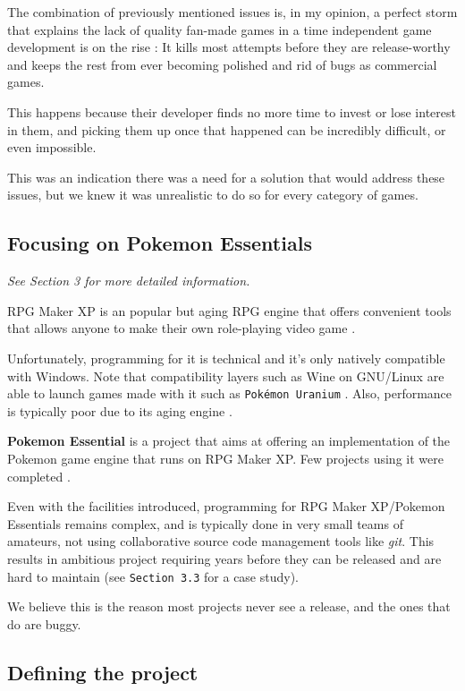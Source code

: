 \documentclass[11pt]{article}
\begin{document}
The combination of previously mentioned issues is, in my opinion, a perfect storm that explains the lack of quality fan-made games in a time independent game development is on the rise : It kills most attempts before they are release-worthy and keeps the rest from ever becoming polished and rid of bugs as commercial games. 

This happens because their developer finds no more time to invest or lose interest in them, and picking them up once that happened can be incredibly difficult, or even impossible.

This was an indication there was a need for a solution that would address these issues, but we knew it was unrealistic to do so for every category of games. 


\subsection{Focusing on Pokemon Essentials}

\textit{See Section 3 for more detailed information.}

RPG Maker XP is an popular but aging RPG engine that offers convenient tools that allows anyone to make their own role-playing video game \cite{RMXP}.

Unfortunately, programming for it is technical and it's only natively compatible with Windows. Note that compatibility layers such as Wine on GNU/Linux are able to launch games made with it such as \texttt{Pokémon Uranium} \cite{LutrisPU}. Also, performance is typically poor due to its aging engine \cite{PoorPerf}.

\textbf{Pokemon Essential} is a project that aims at offering an implementation of the Pokemon game engine that runs on RPG Maker XP. Few projects using it were completed \cite{PkmnFangames}.

Even with the facilities introduced, programming for RPG Maker XP/Pokemon Essentials remains complex, and is typically done in very small teams of amateurs, not using collaborative source code management tools like \textit{git}. This results in ambitious project requiring years before they can be released and are hard to maintain (see \texttt{Section 3.3} for a case study).

We believe this is the reason most projects never see a release, and the ones that do are buggy.


\subsection{Defining the project}
\end{document}
